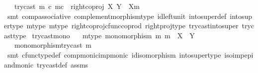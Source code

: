 \begin{isabellebody}
\ \ \ {\isachardoublequoteopen}{\isacharparenleft}{\kern0pt}try{\isacharunderscore}{\kern0pt}cast\ m{\isacharparenright}{\kern0pt}\ {\isasymcirc}\isactrlsub c\ m\isactrlsup c\ {\isacharequal}{\kern0pt}\ right{\isacharunderscore}{\kern0pt}coproj\ X\ {\isacharparenleft}{\kern0pt}Y\ {\isasymsetminus}\ {\isacharparenleft}{\kern0pt}X{\isacharcomma}{\kern0pt}m{\isacharparenright}{\kern0pt}{\isacharparenright}{\kern0pt}{\isachardoublequoteclose}\isanewline
%
\isadelimproof
\ \ %
\endisadelimproof
%
\isatagproof
{}\isamarkupfalse%
\ {\isacharparenleft}{\kern0pt}smt\ comp{\isacharunderscore}{\kern0pt}associative{}\ complement{\isacharunderscore}{\kern0pt}morphism{\isacharunderscore}{\kern0pt}type\ id{\isacharunderscore}{\kern0pt}left{\isacharunderscore}{\kern0pt}unit{}\ into{\isacharunderscore}{\kern0pt}super{\isacharunderscore}{\kern0pt}def\ into{\isacharunderscore}{\kern0pt}super{\isacharunderscore}{\kern0pt}type\ m{\isacharunderscore}{\kern0pt}type{\isacharparenleft}{\kern0pt}{}{\isacharparenright}{\kern0pt}\ m{\isacharunderscore}{\kern0pt}type{\isacharparenleft}{\kern0pt}{}{\isacharparenright}{\kern0pt}\ right{\isacharunderscore}{\kern0pt}coproj{\isacharunderscore}{\kern0pt}cfunc{\isacharunderscore}{\kern0pt}coprod\ right{\isacharunderscore}{\kern0pt}proj{\isacharunderscore}{\kern0pt}type\ try{\isacharunderscore}{\kern0pt}cast{\isacharunderscore}{\kern0pt}into{\isacharunderscore}{\kern0pt}super\ try{\isacharunderscore}{\kern0pt}cast{\isacharunderscore}{\kern0pt}type{\isacharparenright}{\kern0pt}%
\endisatagproof
{\isafoldproof}%
%
\isadelimproof
\isanewline
%
\endisadelimproof
\isanewline
{}\isamarkupfalse%
\ try{\isacharunderscore}{\kern0pt}cast{\isacharunderscore}{\kern0pt}mono{\isacharcolon}{\kern0pt}\isanewline
\ \ \ m{\isacharunderscore}{\kern0pt}type{\isacharcolon}{\kern0pt}\ {\isachardoublequoteopen}monomorphism\ m{\isachardoublequoteclose}\ {\isachardoublequoteopen}m\ {\isacharcolon}{\kern0pt}\ X\ {\isasymrightarrow}\ Y{\isachardoublequoteclose}\isanewline
\ \ \ {\isachardoublequoteopen}monomorphism{\isacharparenleft}{\kern0pt}try{\isacharunderscore}{\kern0pt}cast\ m{\isacharparenright}{\kern0pt}{\isachardoublequoteclose}\isanewline
%
\isadelimproof
\ \ %
\endisadelimproof
%
\isatagproof
{}\isamarkupfalse%
\ {\isacharparenleft}{\kern0pt}smt\ cfunc{\isacharunderscore}{\kern0pt}type{\isacharunderscore}{\kern0pt}def\ comp{\isacharunderscore}{\kern0pt}monic{\isacharunderscore}{\kern0pt}imp{\isacharunderscore}{\kern0pt}monic{\isacharprime}{\kern0pt}\ id{\isacharunderscore}{\kern0pt}isomorphism\ into{\isacharunderscore}{\kern0pt}super{\isacharunderscore}{\kern0pt}type\ iso{\isacharunderscore}{\kern0pt}imp{\isacharunderscore}{\kern0pt}epi{\isacharunderscore}{\kern0pt}and{\isacharunderscore}{\kern0pt}monic\ try{\isacharunderscore}{\kern0pt}cast{\isacharunderscore}{\kern0pt}def{}\ assms{\isacharparenright}{\kern0pt}%

\end{isabellebody}
